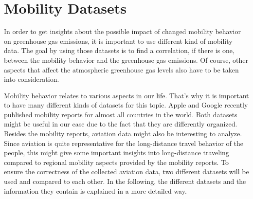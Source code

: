 \section{Mobility Datasets}

In order to get insights about the possible impact of changed mobility behavior on greenhouse gas emissions, it is important to use different kind of mobility data. The goal by using those datasets is to find a correlation, if there is one, between the mobility behavior and the greenhouse gas emissions. Of course, other aspects that affect the atmospheric greenhouse gas levels also have to be taken into consideration.

Mobility behavior relates to various aspects in our life. That's why it is important to have many different kinds of datasets for this topic. Apple and Google recently published mobility reports for almost all countries in the world. Both datasets might be useful in our case due to the fact that they are differently organized. Besides the mobility reports, aviation data might also be interesting to analyze. Since aviation is quite representative for the long-distance travel behavior of the people, this might give some important insights into long-distance traveling compared to regional mobility aspects provided by the mobility reports. To ensure the correctness of the collected aviation data, two different datasets will be used and compared to each other. In the following, the different datasets and the information they contain is explained in a more detailed way.


